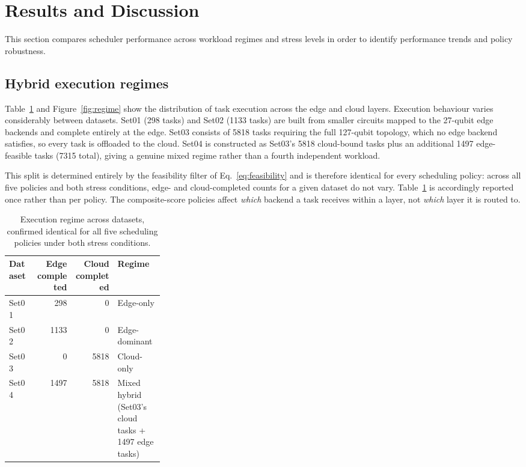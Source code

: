 \documentclass[preprint,12pt]{elsarticle}
\begin{document}
\section{Results and Discussion}
\label{sec:results}
This section compares scheduler performance across workload regimes and stress
levels in order to identify performance trends and policy robustness.

\subsection{Hybrid execution regimes}
\label{sec:regime}
Table~\ref{tab:regime} and Figure~\ref{fig:regime} show the distribution of task
execution across the edge and cloud layers. Execution behaviour varies
considerably between datasets. Set01 (298 tasks) and Set02 (1133 tasks) are
built from smaller circuits mapped to the 27-qubit edge backends and complete
entirely at the edge. Set03 consists of 5818 tasks requiring the full 127-qubit
topology, which no edge backend satisfies, so every task is offloaded to the
cloud. Set04 is constructed as Set03's 5818 cloud-bound tasks plus an additional
1497 edge-feasible tasks (7315 total), giving a genuine mixed regime rather than
a fourth independent workload.

This split is determined entirely by the feasibility filter of
Eq.~\eqref{eq:feasibility} and is therefore identical for every scheduling
policy: across all five policies and both stress conditions, edge- and
cloud-completed counts for a given dataset do not vary. Table~\ref{tab:regime}
is accordingly reported once rather than per policy. The composite-score
policies affect \emph{which} backend a task receives within a layer, not
\emph{which} layer it is routed to.

\begin{table}[htbp]
\centering
\caption{Execution regime across datasets, confirmed identical for all five
scheduling policies under both stress conditions.}
\label{tab:regime}
\begin{tabular}{lrrp{0.3\linewidth}}
\toprule
\textbf{Dataset} & \textbf{Edge completed} & \textbf{Cloud completed} & \textbf{Regime} \\
\midrule
Set01 & 298  & 0    & Edge-only \\
Set02 & 1133 & 0    & Edge-dominant \\
Set03 & 0    & 5818 & Cloud-only \\
Set04 & 1497 & 5818 & Mixed hybrid (Set03's cloud tasks + 1497 edge tasks) \\
\bottomrule
\end{tabular}
\end{table}
\end{document}
